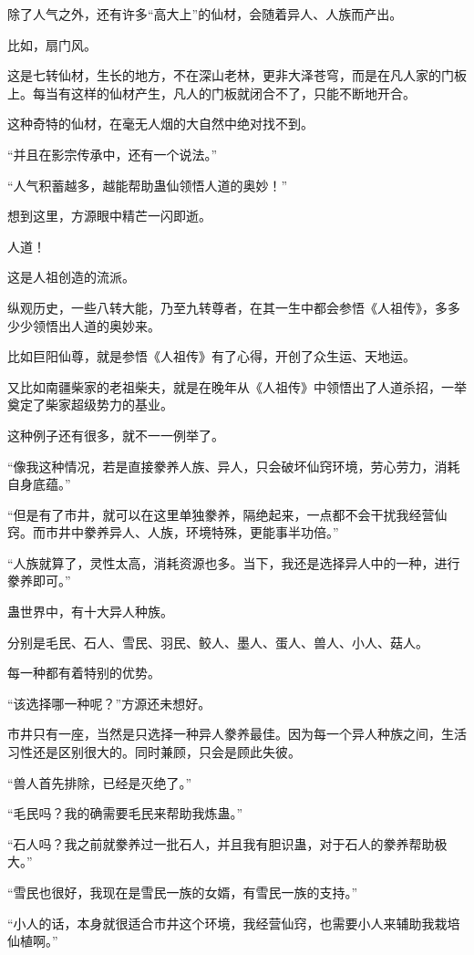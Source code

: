 \begin{this_body}
除了人气之外，还有许多“高大上”的仙材，会随着异人、人族而产出。

比如，扇门风。

这是七转仙材，生长的地方，不在深山老林，更非大泽苍穹，而是在凡人家的门板上。每当有这样的仙材产生，凡人的门板就闭合不了，只能不断地开合。

这种奇特的仙材，在毫无人烟的大自然中绝对找不到。

“并且在影宗传承中，还有一个说法。”

“人气积蓄越多，越能帮助蛊仙领悟人道的奥妙！”

想到这里，方源眼中精芒一闪即逝。

人道！

这是人祖创造的流派。

纵观历史，一些八转大能，乃至九转尊者，在其一生中都会参悟《人祖传》，多多少少领悟出人道的奥妙来。

比如巨阳仙尊，就是参悟《人祖传》有了心得，开创了众生运、天地运。

又比如南疆柴家的老祖柴夫，就是在晚年从《人祖传》中领悟出了人道杀招，一举奠定了柴家超级势力的基业。

这种例子还有很多，就不一一例举了。

“像我这种情况，若是直接豢养人族、异人，只会破坏仙窍环境，劳心劳力，消耗自身底蕴。”

“但是有了市井，就可以在这里单独豢养，隔绝起来，一点都不会干扰我经营仙窍。而市井中豢养异人、人族，环境特殊，更能事半功倍。”

“人族就算了，灵性太高，消耗资源也多。当下，我还是选择异人中的一种，进行豢养即可。”

蛊世界中，有十大异人种族。

分别是毛民、石人、雪民、羽民、鲛人、墨人、蛋人、兽人、小人、菇人。

每一种都有着特别的优势。

“该选择哪一种呢？”方源还未想好。

市井只有一座，当然是只选择一种异人豢养最佳。因为每一个异人种族之间，生活习性还是区别很大的。同时兼顾，只会是顾此失彼。

“兽人首先排除，已经是灭绝了。”

“毛民吗？我的确需要毛民来帮助我炼蛊。”

“石人吗？我之前就豢养过一批石人，并且我有胆识蛊，对于石人的豢养帮助极大。”

“雪民也很好，我现在是雪民一族的女婿，有雪民一族的支持。”

“小人的话，本身就很适合市井这个环境，我经营仙窍，也需要小人来辅助我栽培仙植啊。”


\end{this_body}
